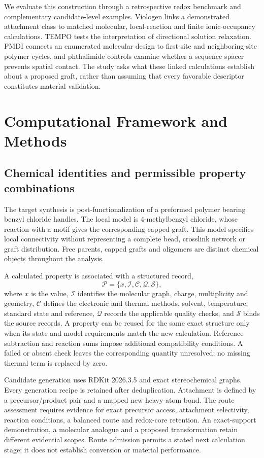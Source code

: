 \documentclass[11pt]{article}
\begin{document}
We evaluate this construction through a retrospective redox benchmark and complementary candidate-level examples. Viologen links a demonstrated attachment class to matched molecular, local-reaction and finite ionic-occupancy calculations. TEMPO tests the interpretation of directional solution relaxation. PMDI connects an enumerated molecular design to first-site and neighboring-site polymer cycles, and phthalimide controls examine whether a sequence spacer prevents spatial contact. The study asks what these linked calculations establish about a proposed graft, rather than assuming that every favorable descriptor constitutes material validation.

\section{Computational Framework and Methods}
\subsection{Chemical identities and permissible property combinations}
The target synthesis is post-functionalization of a preformed polymer bearing benzyl chloride handles. The local model is 4-methylbenzyl chloride, whose reaction with a motif gives the corresponding capped graft. This model specifies local connectivity without representing a complete bead, crosslink network or graft distribution. Free parents, capped grafts and oligomers are distinct chemical objects throughout the analysis.

A calculated property is associated with a structured record,
\begin{equation}
\mathcal{P}=\{x,\mathcal{I},\mathcal{C},\mathcal{Q},\mathcal{S}\},
\end{equation}
where $x$ is the value, $\mathcal{I}$ identifies the molecular graph, charge, multiplicity and geometry, $\mathcal{C}$ defines the electronic and thermal methods, solvent, temperature, standard state and reference, $\mathcal{Q}$ records the applicable quality checks, and $\mathcal{S}$ binds the source records. A property can be reused for the same exact structure only when its state and model requirements match the new calculation. Reference subtraction and reaction sums impose additional compatibility conditions. A failed or absent check leaves the corresponding quantity unresolved; no missing thermal term is replaced by zero.

Candidate generation uses RDKit 2026.3.5 and exact stereochemical graphs.\cite{rdkit} Every generation recipe is retained after deduplication. Attachment is defined by a precursor/product pair and a mapped new heavy-atom bond. The route assessment requires evidence for exact precursor access, attachment selectivity, reaction conditions, a balanced route and redox-core retention. An exact-support demonstration, a molecular analogue and a proposed transformation retain different evidential scopes. Route admission permits a stated next calculation stage; it does not establish conversion or material performance.
\end{document}
